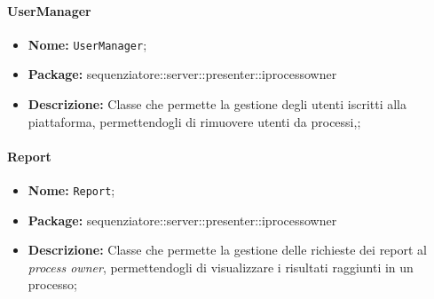 \paragraph{UserManager}
	\begin{itemize}
		\item \textbf{Nome:} \texttt{UserManager};
		\item \textbf{Package:} sequenziatore::server::presenter::iprocessowner
		\item \textbf{Descrizione:} Classe che permette la gestione degli utenti iscritti alla piattaforma, permettendogli di rimuovere utenti da processi,;
	\end{itemize}

\paragraph{Report}
	\begin{itemize}
		\item \textbf{Nome:} \texttt{Report};
		\item \textbf{Package:} sequenziatore::server::presenter::iprocessowner
		\item \textbf{Descrizione:} Classe che permette la gestione delle richieste dei report al \textit{process owner}, permettendogli di visualizzare i risultati raggiunti in un processo;
	\end{itemize}
